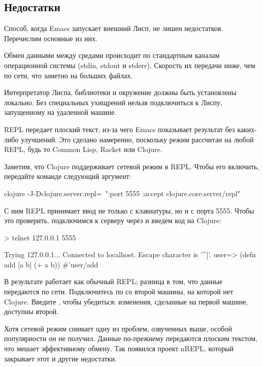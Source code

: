 \subsection{Недостатки}

Способ, когда Emacs запускает внешний Лисп, не лишен недостатков. Перечислим основные из них.

Обмен данными между средами происходит по стандартным каналам операционной системы (stdin, stdout и stderr). Скорость их передачи ниже, чем по сети, что заметно на больших файлах.

Интерпретатор Лиспа, библиотеки и окружение должны быть установлены локально. Без специальных ухищрений нельзя подключиться к Лиспу, запущенному на удаленной машине.

REPL передает плоский текст, из-за чего Emacs показывает результат без каких-либо улучшений. Это сделано намеренно, поскольку режим  рассчитан на любой REPL, будь то Common Lisp, Racket или Clojure.

Заметим, что Clojure поддерживает сетевой режим в REPL. Чтобы его включить, передайте команде  следующий аргумент:

\begin{english}
  \begin{bash}
clojure -J-Dclojure.server.repl=\
  "{:port 5555 :accept clojure.core.server/repl}"
  \end{bash}
\end{english}

С ним REPL принимает ввод не только с клавиатуры, но и с порта 5555. Чтобы это проверить, подключимся к серверу через  и введем код на Clojure:

\begin{english}
  \begin{text}
> telnet 127.0.0.1 5555

Trying 127.0.0.1...
Connected to localhost.
Escape character is '^]'.
user=> (defn add [a b] (+ a b))
#'user/add
  \end{text}
\end{english}

В результате  работает как обычный REPL; разница в том, что данные передаются по сети. Подключитесь по  со второй машины, на которой нет Clojure. Введите , чтобы убедиться: изменения, сделанные на первой машине, доступны второй.

Хотя сетевой режим снимает одну из проблем, озвученных выше, особой популярности он не получил. Данные по-прежнему передаются плоским текстом, что мешает эффективному обмену. Так появился проект nREPL, который закрывает этот и другие недостатки.


